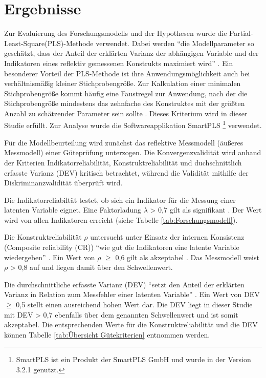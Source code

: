 \section{Ergebnisse}
\label{sec:ergebnisse}
\nocite{lohmoller2013latent}
Zur Evaluierung des Forschungsmodells und der Hypothesen wurde die Partial-Least-Square(PLS)-Methode verwendet. Dabei werden "`die Modellparameter so geschätzt, dass der Anteil der erklärten Varianz der abhängigen Variable und der Indikatoren eines reflektiv gemessenen Konstrukts maximiert wird"' \parencite[S.16]{nitzl2010anwenderorientierte}. Ein besonderer Vorteil der PLS-Methode ist ihre Anwendungsmöglichkeit auch bei verhältnismäßig kleiner Stichprobengröße. Zur Kalkulation einer minimalen Stichprobengröße kommt häufig eine Faustregel zur Anwendung, nach der die Stichprobengröße mindestens das zehnfache des Konstruktes mit der größten Anzahl zu schätzender Parameter sein sollte \parencite[vgl.][S.394]{islam2013investigating}. Dieses Kriterium wird in dieser Studie erfüllt. Zur Analyse wurde die Softwareapplikation SmartPLS \footnote{SmartPLS ist ein Produkt der SmartPLS GmbH und wurde in der Version 3.2.1 genutzt.} verwendet. 

Für die Modellbeurteilung wird zunächst das reflektive Messmodell (äußeres Messmodell) einer Güteprüfung unterzogen. Die Konvergenzvalidität wird anhand der Kriterien Indikatorreliabilität, Konstruktreliabilität und duchschnittlich erfasste Varianz (DEV) kritisch betrachtet, während die Validität mithilfe der Diskriminanzvalidität überprüft wird.

Die Indikatorreliabiltät testet, ob sich ein Indikator für die Messung einer latenten Variable eignet. Eine Faktorladung $\lambda$ > 0,7 gilt als signifikant \parencite[vgl.][S.24]{nitzl2010anwenderorientierte}. Der Wert wird von allen Indikatoren erreicht (siehe Tabelle \ref{tab:Forschungsmodell}). 

Die Konstruktreliabilität $\rho$ untersucht unter Einsatz der internen Konsistenz (Composite reliability (CR)) "`wie gut die Indikatoren eine latente Variable wiedergeben"' \parencite[S.25]{nitzl2010anwenderorientierte}. Ein Wert von $\rho$ $\geq$ 0,6 gilt als akzeptabel \parencite[vgl.][S.212]{ringle2007beurteilung}. Das Messmodell weist $\rho$ > 0,8 auf und liegen damit über den Schwellenwert.  

Die durchschnittliche erfasste Varianz (DEV) "`setzt den Anteil der erklärten Varianz in Relation zum Messfehler einer latenten Variable"'  \parencite[S.25]{nitzl2010anwenderorientierte}. Ein Wert von DEV $\geq$ 0,5 stellt einen ausreichend hohen Wert dar. Die DEV liegt in dieser Studie mit DEV > 0,7 ebenfalls über dem genannten Schwellenwert und ist somit akzeptabel. Die entsprechenden Werte für die Konstruktreliabilität und die DEV können Tabelle \ref{tab:Übersicht Gütekriterien} entnommen werden. 

